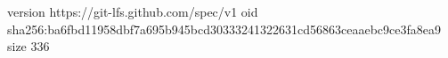 version https://git-lfs.github.com/spec/v1
oid sha256:ba6fbd11958dbf7a695b945bcd30333241322631cd56863ceaaebc9ce3fa8ea9
size 336
